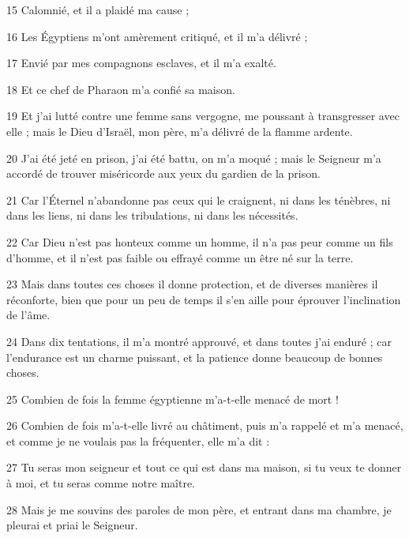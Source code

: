 \par 15 Calomnié, et il a plaidé ma cause ;

\par 16 Les Égyptiens m'ont amèrement critiqué, et il m'a délivré ;

\par 17 Envié par mes compagnons esclaves, et il m'a exalté.

\par 18 Et ce chef de Pharaon m'a confié sa maison.

\par 19 Et j'ai lutté contre une femme sans vergogne, me poussant à transgresser avec elle ; mais le Dieu d'Israël, mon père, m'a délivré de la flamme ardente.

\par 20 J'ai été jeté en prison, j'ai été battu, on m'a moqué ; mais le Seigneur m'a accordé de trouver miséricorde aux yeux du gardien de la prison.

\par 21 Car l'Éternel n'abandonne pas ceux qui le craignent, ni dans les ténèbres, ni dans les liens, ni dans les tribulations, ni dans les nécessités.

\par 22 Car Dieu n'est pas honteux comme un homme, il n'a pas peur comme un fils d'homme, et il n'est pas faible ou effrayé comme un être né sur la terre.

\par 23 Mais dans toutes ces choses il donne protection, et de diverses manières il réconforte, bien que pour un peu de temps il s'en aille pour éprouver l'inclination de l'âme.

\par 24 Dans dix tentations, il m'a montré approuvé, et dans toutes j'ai enduré ; car l'endurance est un charme puissant, et la patience donne beaucoup de bonnes choses.

\par 25 Combien de fois la femme égyptienne m'a-t-elle menacé de mort !

\par 26 Combien de fois m'a-t-elle livré au châtiment, puis m'a rappelé et m'a menacé, et comme je ne voulais pas la fréquenter, elle m'a dit :

\par 27 Tu seras mon seigneur et tout ce qui est dans ma maison, si tu veux te donner à moi, et tu seras comme notre maître.

\par 28 Mais je me souvins des paroles de mon père, et entrant dans ma chambre, je pleurai et priai le Seigneur.

